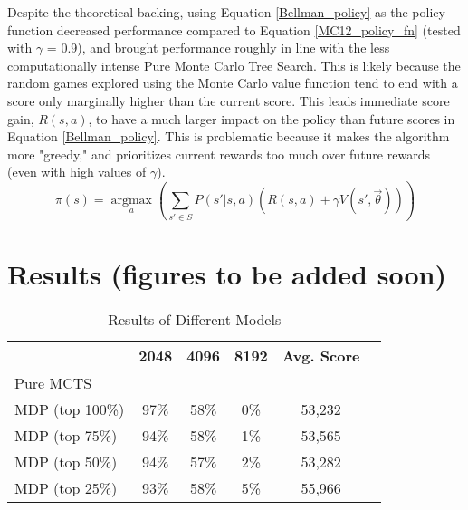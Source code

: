 \documentclass{article}
\DeclareMathOperator*{\argmax}{argmax}
\begin{document}
Despite the theoretical backing, using Equation \ref{Bellman_policy} as the policy function decreased performance compared to Equation \ref{MC12_policy_fn} (tested with $\gamma$ = 0.9), and brought performance roughly in line with the less computationally intense Pure Monte Carlo Tree Search.  This is likely because the random games explored using the Monte Carlo value function tend to end with a score only marginally higher than the current score.  This leads immediate score gain, $R(s, a)$, to have a much larger impact on the policy than future scores in Equation \ref{Bellman_policy}.  This is problematic because it makes the algorithm more "greedy," and prioritizes current rewards too much over future rewards (even with high values of $\gamma$).
\begin{equation}
\label{Bellman_policy}
\pi(s) = \argmax\limits_{a}\left( \sum\limits_{s' \in S} P(s'|s, a)(R(s,a) + \gamma V(s', \vec{\theta})) \right)
\end{equation}


\section{Results (figures to be added soon)}


\begin{table}[h]
  \caption{Results of Different Models}
  \begin{tabular}{|l|c|c|c|c|c|}
    \hline
    & 2048 & 4096 & 8192 & Avg. Score \\
    \hline
    Pure MCTS & & & & \\
    \hline
    MDP (top 100\%) & \cellcolor{green!25}97\% & \cellcolor{green!25}58\% & 0\% & 53,232\\
    \hline
    MDP (top 75\%) & 94\% & \cellcolor{green!25}58\% & 1\% & 53,565\\
    \hline
    MDP (top 50\%) & 94\% & 57\% & 2\% & 53,282\\
    \hline
    MDP (top 25\%) & 93\% & \cellcolor{green!25}58\% & \cellcolor{green!25}5\% & \cellcolor{green!25}55,966 \\
    \hline
  \end{tabular}
\end{table}
\end{document}
